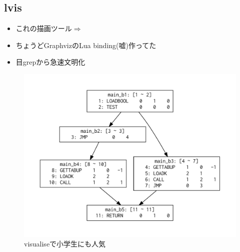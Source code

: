 \subsection{lvis}
\begin{frame}
	\frametitlesubs

	\begin{minipage}[t]{.49\textwidth}
		\begin{itemize}
			\item これの描画ツール$\Rightarrow$
			\item ちょうどGraphvizのLua binding(嘘)\footnotemark{}作ってた
			\item 目grepから急速文明化
		\end{itemize}
	\end{minipage}
	\begin{minipage}[t]{.47\textwidth}
		\begin{figure}[h]
			\centering
			\includegraphics[width=\textwidth]{img/cfg.pdf}
			\caption{visualiseで小学生にも人気}
		\end{figure}
	\end{minipage}

\end{frame}
